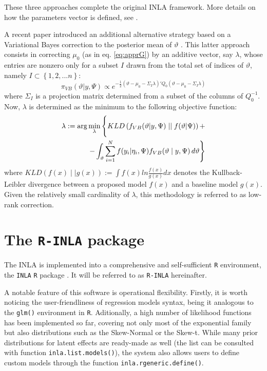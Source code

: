 \documentclass[openany]{book}
\begin{document}
These three approaches complete the original INLA framework. More details on how the parameters vector is defined, see \cite{INLA2017}. 

A recent paper introduced an additional alternative strategy based on a Variational Bayes correction to the posterior mean of $\vartheta$ \cite{VB}. This latter approach consists in correcting $\mu_0$ (as in eq. \ref{eq:apprG}) by an additive vector, say $\lambda$, whose entries are nonzero only for a subset $I$ drawn from the total set of indices of $\vartheta$, namely $I \subset \left\{ 1, 2, ... n\right \}$:
$$
\pi_{VB}(\vartheta | y, \Psi) \propto e^{\displaystyle{
 - \frac{1}{2}(\vartheta - \mu_0 - \Sigma_I \lambda)'Q_0(\vartheta - \mu_0 - \Sigma_I \lambda)
}}
$$
where $\Sigma_I$ is a projection matrix determined from a subset of the columns of $Q_0^{-1}$. Now, $\lambda$ is determined as the minimum to the following objective function:
\begin{equation}
\begin{aligned}
\lambda := \arg \min_{\lambda} \Bigg{\lbrace}
KLD\left( f_{VB}(\vartheta | y, \Psi) \mid \mid f(\vartheta | \Psi)\right) + \\
-\int_{\vartheta}  \sum_{i=1}^{N} f(y_i | \eta_i, \Psi) f_{VB}(\vartheta \mid y, \Psi)\, d \vartheta \Bigg{\rbrace}
\label{VBINLA}
\end{aligned}
\end{equation}
where $KLD(f(x) \mid \mid g(x)) := \int f(x) ln \displaystyle{\frac{f(x)}{g(x)}}  dx$ denotes the Kullback-Leibler divergence between a proposed model $f(x)$ and a baseline model $g(x)$. Given the relatively small cardinality of $\lambda$, this methodology is referred to as low-rank correction. 

\section{The \texttt{R-INLA} package} \label{section:r_inla}

The INLA is implemented into a comprehensive and self-sufficient \texttt{R} environment, the \texttt{INLA} \texttt{R} package \citep{INLAbook, Wang}. It will be referred to as \texttt{R-INLA} hereinafter. 

A notable feature of this software is operational flexibility. Firstly, it is worth noticing the user-friendliness of regression models syntax, being it analogous to the \texttt{glm()} environment in \texttt{R}. Aditionally, a high number of likelihood functions has been implemented so far, covering not only most of the exponential family but also distributions such as the Skew-Normal \citep{SN} or the Skew-t. While many prior distributions for latent effects are ready-made as well (the list can be consulted with function \texttt{inla.list.models()}), the system also allows users to define custom models through the function \texttt{inla.rgeneric.define()}. 
\end{document}
